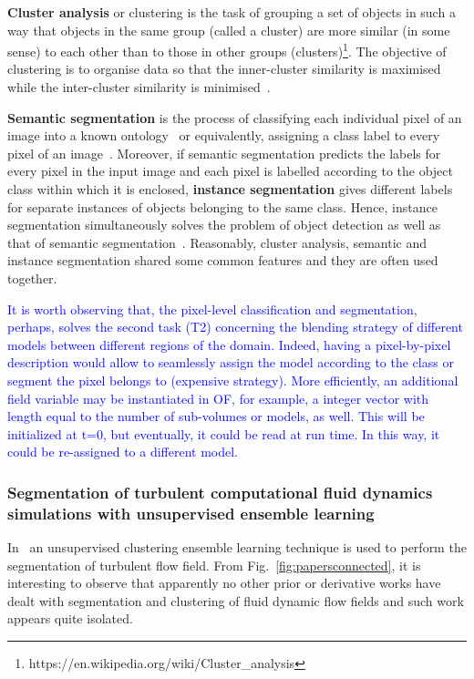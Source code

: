 \textbf{Cluster analysis} or clustering is the task of grouping a set of objects in such a way that objects in the same group (called a cluster) are more similar (in some sense) to each other than to those in other groups (clusters)\footnote{https://en.wikipedia.org/wiki/Cluster\_analysis}. The objective of clustering is to organise data so that the inner-cluster similarity is maximised while the inter-cluster similarity is minimised~\cite{kaiser2014cluster}. 
 
\textbf{Semantic segmentation} is the process of classifying each individual pixel of an image into a known ontology~\cite{hamilton2022unsupervised} or equivalently, assigning a class label to every pixel of an image~\cite{van2021unsupervised}. Moreover, if semantic segmentation predicts the labels for every pixel in the input image and each pixel is labelled according to the object class within which it is enclosed, \textbf{instance segmentation} gives different labels for separate instances of objects belonging to the same class. Hence, instance segmentation simultaneously solves the problem of object detection as well as that of semantic segmentation~\cite{hafiz2020survey}. Reasonably, cluster analysis, semantic and instance segmentation shared some common features and they are often used together.

\vspace{10pt}
\noindent \textcolor{blue}{It is worth observing that, the pixel-level classification and segmentation, perhaps, solves the second task (T2) concerning the blending strategy of different models between different regions of the domain. Indeed, having a pixel-by-pixel description would allow to seamlessly assign the model according to the class or segment the pixel belongs to (expensive strategy). More efficiently, an additional field variable may be instantiated in OF, for example, a integer vector with length equal to the number of sub-volumes or models, as well. This will be initialized at t=0, but eventually, it could be read at run time. In this way, it could be re-assigned to a different model.}

\subsubsection{Segmentation of turbulent computational fluid dynamics simulations with
unsupervised ensemble learning~\cite{bussov2021segmentation}}
In~\cite{bussov2021segmentation} an unsupervised clustering ensemble learning technique is used to perform the segmentation of turbulent flow field. From Fig.~\ref{fig:papersconnected}, it is interesting to observe that apparently no other prior or derivative works have dealt with segmentation and clustering of fluid dynamic flow fields and such work appears quite isolated. 

